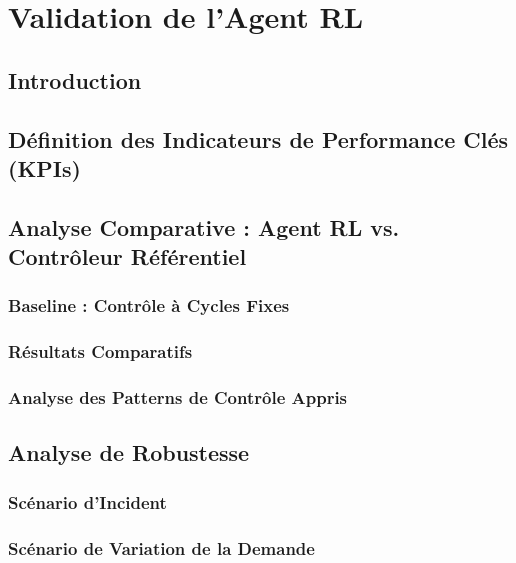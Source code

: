 \section{Validation de l'Agent RL}
\label{sec:evaluation_robustesse}

\subsection{Introduction}

\subsection{Définition des Indicateurs de Performance Clés (KPIs)}

\subsection{Analyse Comparative : Agent RL vs. Contrôleur Référentiel}
\subsubsection{Baseline : Contrôle à Cycles Fixes}

\subsubsection{Résultats Comparatifs}

\subsubsection{Analyse des Patterns de Contrôle Appris}

\subsection{Analyse de Robustesse}
\subsubsection{Scénario d'Incident}

\subsubsection{Scénario de Variation de la Demande}

